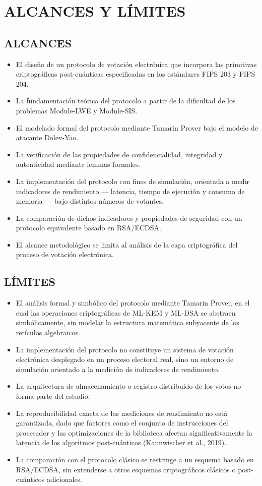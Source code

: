 \section{ALCANCES Y LÍMITES}

\subsection{ALCANCES}
\begin{itemize}
	\item El diseño de un protocolo de votación electrónica que incorpora las primitivas criptográficas post-cuánticas especificadas en los estándares FIPS 203 y FIPS 204.
	\item La fundamentación teórica del protocolo a partir de la dificultad de los problemas Module-LWE y Module-SIS.
	\item El modelado formal del protocolo mediante Tamarin Prover bajo el modelo de atacante Dolev-Yao.
	\item La verificación de las propiedades de confidencialidad, integridad y autenticidad mediante lemmas formales.
	\item La implementación del protocolo con fines de simulación, orientada a medir indicadores de rendimiento --- latencia, tiempo de ejecución y consumo de memoria --- bajo distintos números de votantes.
	\item La comparación de dichos indicadores y propiedades de seguridad con un protocolo equivalente basado en RSA/ECDSA.
	\item El alcance metodológico se limita al análisis de la capa criptográfica del proceso de votación electrónica.
\end{itemize}

\subsection{LÍMITES}
\begin{itemize}
	\item El análisis formal y simbólico del protocolo mediante Tamarin Prover, en el cual las operaciones criptográficas de ML-KEM y ML-DSA se abstraen simbólicamente, sin modelar la estructura matemática subyacente de los retículos algebraicos.
	\item La implementación del protocolo no constituye un sistema de votación electrónica desplegado en un proceso electoral real, sino un entorno de simulación orientado a la medición de indicadores de rendimiento.
	\item La arquitectura de almacenamiento o registro distribuido de los votos no forma parte del estudio.
	\item La reproducibilidad exacta de las mediciones de rendimiento no está garantizada, dado que factores como el conjunto de instrucciones del procesador y las optimizaciones de la biblioteca afectan significativamente la latencia de los algoritmos post-cuánticos (Kannwischer et al., 2019).
	\item La comparación con el protocolo clásico se restringe a un esquema basado en RSA/ECDSA, sin extenderse a otros esquemas criptográficos clásicos o post-cuánticos adicionales.
\end{itemize}

